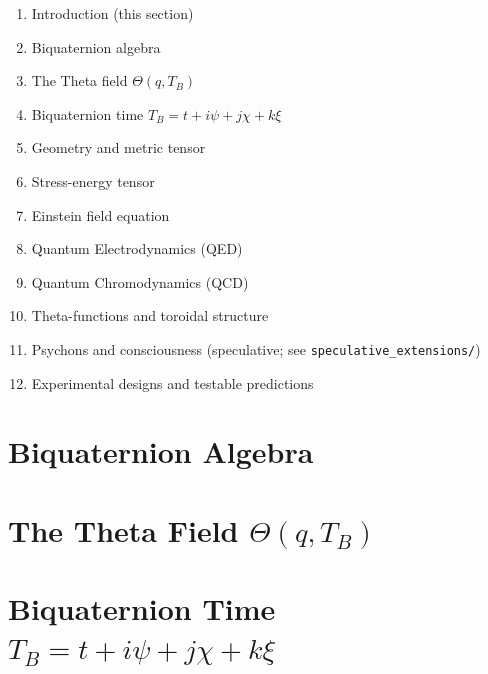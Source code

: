 \documentclass[12pt,a4paper]{article}
\begin{document}
\begin{enumerate}
    \item Introduction (this section)
    \item Biquaternion algebra
    \item The Theta field $\Theta(q,T_B)$
    \item Biquaternion time $T_B = t + i\psi + j\chi + k\xi$
    \item Geometry and metric tensor
    \item Stress-energy tensor
    \item Einstein field equation
    \item Quantum Electrodynamics (QED)
    \item Quantum Chromodynamics (QCD)
    \item Theta-functions and toroidal structure
    \item Psychons and consciousness (speculative; see \texttt{speculative\_extensions/})
    \item Experimental designs and testable predictions
\end{enumerate}


\section{Biquaternion Algebra}
\label{sec:biquaternion_algebra}



\section{The Theta Field $\Theta(q,T_B)$}
\label{sec:theta_field}




\section{Biquaternion Time $T_B = t + i\psi + j\chi + k\xi$}
\label{sec:biquaternion_time}
\end{document}
